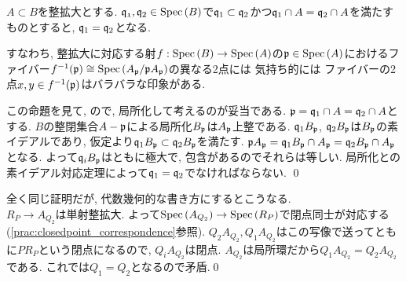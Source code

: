 \begin{cor}
$A\subset B$を整拡大とする. $\mathfrak{q_1},\mathfrak{q}_2 \in\mathrm{Spec}\left( B \right)$で$\mathfrak{q}_1\subset \mathfrak{q}_2$かつ$\mathfrak{q}_1\cap A = \mathfrak{q}_{2}\cap A$を満たすものとすると, $\mathfrak{q}_1 = \mathfrak{q}_{2}$となる.
\end{cor}
\begin{rem}
すなわち, 整拡大に対応する射$f:\mathrm{Spec}\left( B \right)\to \mathrm{Spec}\left( A \right)$の$\mathfrak{p}\in \mathrm{Spec}\left( A \right)$におけるファイバー$f^{-1}(\mathfrak{p})\cong \mathrm{Spec}\left( A_{\mathfrak{p}}/\mathfrak{p}A_{\mathfrak{p}} \right)$の異なる2点には 気持ち的には ファイバーの2点$x,y\in f^{-1}(\mathfrak{p})$はバラバラな印象がある.
\end{rem}
\prf この命題を見て, ので, 局所化して考えるのが妥当である. $\mathfrak{p} = \mathfrak{q}_{1}\cap A = \mathfrak{q}_{2}\cap A$とする. $B$の整閉集合$A-\mathfrak{p}$による局所化$B_{\mathfrak{p}}$は$A_{\mathfrak{p}}$上整である. $\mathfrak{q}_{1}B_{\mathfrak{p}}$, $\mathfrak{q}_{2}B_{\mathfrak{p}}$は$B_{\mathfrak{p}}$の素イデアルであり, 仮定より$\mathfrak{q}_{1}B_{\mathfrak{p}} \subset \mathfrak{q}_{2}B_{\mathfrak{p}}$を満たす. $\mathfrak{p}A_{\mathfrak{p}} = \mathfrak{q}_{1}B_{\mathfrak{p}}\cap A_{\mathfrak{p}} = \mathfrak{q}_{2}B_{\mathfrak{p}}\cap A_{\mathfrak{p}}$となる.  よって$\mathfrak{q}_{i}B_{\mathfrak{p}}$はともに極大で, 包含があるのでそれらは等しい. 局所化との素イデアル対応定理によって$\mathfrak{q}_{1} = \mathfrak{q}_{2}$でなければならない. \qed

{\small
\begin{rem} 全く同じ証明だが, 代数幾何的な書き方にするとこうなる.\\
$R_{P} \to A_{Q_2}$は単射整拡大. よって$\mathrm{Spec}\left( A_{Q_2} \right)\to \mathrm{Spec}\left( R_P \right)$で閉点同士が対応する(\ref{prac:closedpoint_correspondence}参照). $Q_2A_{Q_2}, Q_1A_{Q_2}$はこの写像で送ってともに$PR_P$という閉点になるので, $Q_iA_{Q_2}$は閉点. $A_{Q_2}$は局所環だから$Q_1A_{Q_2} = Q_2A_{Q_2}$である. これでは$Q_1=Q_2$となるので矛盾.\qed
\end{rem}
}

